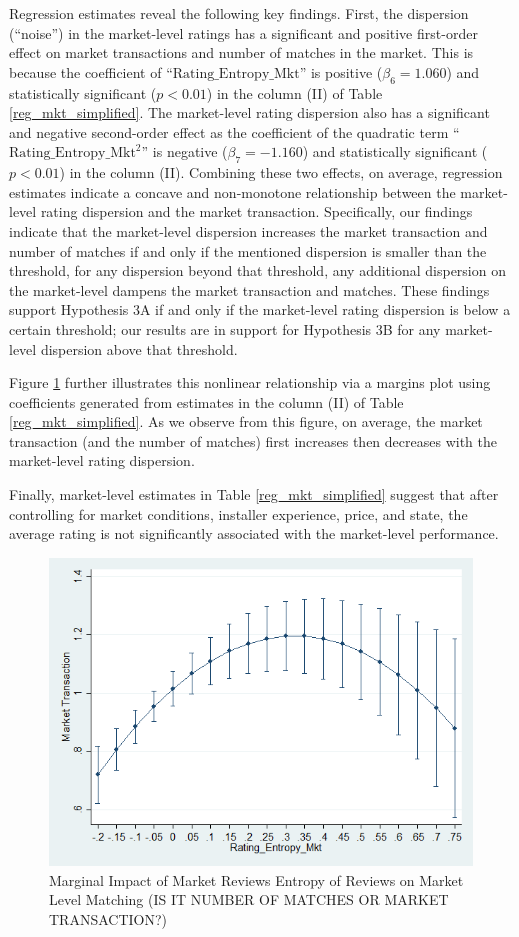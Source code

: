 \documentclass[msom,blindrev]{informs3}
\begin{document}
Regression estimates reveal the following key findings. First, the dispersion (``noise'') in the market-level ratings has a significant and positive first-order effect on market transactions and number of matches in the market. This is because the coefficient of ``$\text{Rating\_Entropy\_Mkt}$'' is positive ($\beta_{6}=1.060$) and statistically significant ($p<0.01$) in the column (II) of Table \ref{reg_mkt_simplified}. The market-level rating dispersion also has a significant and negative second-order effect as the coefficient of the quadratic term ``$\text{Rating\_Entropy\_Mkt}^2$'' is negative ($\beta_{7}=-1.160$) and statistically significant ($p<0.01$) in the column (II). Combining these two effects, on average, regression estimates indicate a concave and non-monotone relationship between the market-level rating dispersion and the market transaction.  Specifically, our findings indicate that the market-level dispersion increases the market transaction and number of matches if and only if the mentioned dispersion is smaller than the threshold, for any dispersion beyond that threshold, any additional dispersion on the market-level dampens the market transaction and matches. These findings support Hypothesis 3A if and only if the market-level rating dispersion is below a certain threshold; our results are in support for Hypothesis 3B for any market-level dispersion above that threshold.

Figure \ref{fig: marginsplot_mkt_entmkt} further illustrates this nonlinear relationship via a margins plot using coefficients generated from estimates in the column (II) of Table \ref{reg_mkt_simplified}. As we observe from this figure, on average, the market transaction (and the number of matches) first increases then decreases with the market-level rating dispersion.

Finally, market-level estimates in Table \ref{reg_mkt_simplified} suggest that after controlling for market conditions, installer experience, price, and state, the average rating is not significantly associated with the market-level performance.
\begin{figure}
	\centering
	\includegraphics[width=0.7\linewidth]{marginsplot_entmkt.png}
	\caption{Marginal Impact of Market Reviews Entropy of Reviews on Market Level Matching (IS IT NUMBER OF MATCHES OR MARKET TRANSACTION?)}
	\label{fig: marginsplot_mkt_entmkt}
\end{figure}
\end{document}
